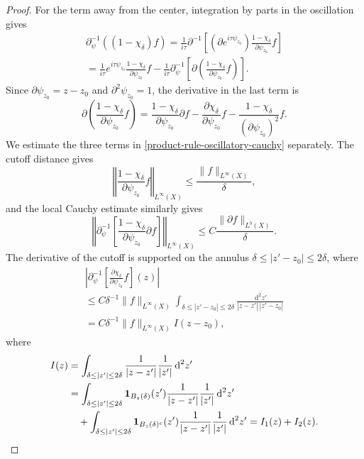\documentclass[a4paper,11pt]{article}
\newcommand{\pr}{\partial}
\newcommand{\psiz}{\psi_{z_0}}
\newcommand{\dd}{\,\text{d}}
\theoremstyle{plain}
\theoremstyle{definition}
\theoremstyle{remark}
\begin{document}
\begin{proof}
For the term away from the center, integration by parts in the oscillation gives
\begin{multline}
\pr_\psi^{-1}\left((1-\chi_\delta)f\right)
=\frac{1}{i\tau}\pr^{-1}\left[(\pr e^{i\tau\psiz}) \frac{1-\chi_\delta}{\pr\psiz} f  \right]\\[5pt]
=\frac{1}{i\tau}e^{i\tau\psiz}\frac{1-\chi_\delta}{\pr\psiz} f
-\frac{1}{i\tau}\pr_\psi^{-1}\left[\pr\left(\frac{1-\chi_\delta}{\pr\psiz} f\right)\right].
\end{multline}
Since $\partial\psi_{z_0}=z-z_0$ and $\partial^2\psi_{z_0}=1$, the derivative in the last term is
\begin{equation}\label{product-rule-oscillatory-cauchy}
\partial\left(\frac{1-\chi_\delta}{\partial\psi_{z_0}}f\right)
=\frac{1-\chi_\delta}{\partial\psi_{z_0}}\partial f
-\frac{\partial\chi_\delta}{\partial\psi_{z_0}}f
-\frac{1-\chi_\delta}{(\partial\psi_{z_0})^2}f .
\end{equation}
We estimate the three terms in \eqref{product-rule-oscillatory-cauchy} separately.  The cutoff distance gives
\begin{equation}
\left\Vert \frac{1-\chi_\delta}{\pr\psiz} f\right\Vert_{L^\infty(X)}\leq\frac{\|f\|_{L^\infty(X)}}{\delta},
\end{equation}
and the local Cauchy estimate similarly gives
\begin{equation}
\left\Vert\pr_\psi^{-1}\left[\frac{1-\chi_\delta}{\pr\psiz} \pr f  \right]\right\Vert_{L^\infty(X)}\leq C\frac{\|\pr f\|_{L^b(X)}}{\delta}.
\end{equation}
The derivative of the cutoff is supported on the annulus $\delta\leq |z'-z_0|\leq2\delta$, where
\begin{multline}
\left|\pr_\psi^{-1}\left[\frac{\pr \chi_\delta}{\pr\psiz} f  \right](z)\right| \\
\leq C\delta^{-1}\|f\|_{L^\infty(X)}
\int_{\delta\leq|z'-z_0|\leq2\delta}
\frac{\dd^2z'}{|z-z'|\,|z'-z_0|}\\[5pt]
= C\delta^{-1}\|f\|_{L^\infty(X)}I(z-z_0),
\end{multline}
where
\begin{align}
I(z)
&=\int_{\delta\leq|z'|\leq2\delta}\frac{1}{|z-z'|}\frac{1}{|z'|}\dd^2z' \notag\\
&=\int_{\delta\leq|z'|\leq2\delta}\mathbf{1}_{B_{z}(\delta)}(z')\frac{1}{|z-z'|}\frac{1}{|z'|}\dd^2z' \notag\\
&\quad +\int_{\delta\leq|z'|\leq2\delta}\mathbf{1}_{B_{z}(\delta)^c}(z')\frac{1}{|z-z'|}\frac{1}{|z'|}\dd^2z'
=I_1(z)+I_2(z).

\end{align}
\end{proof}
\end{document}
